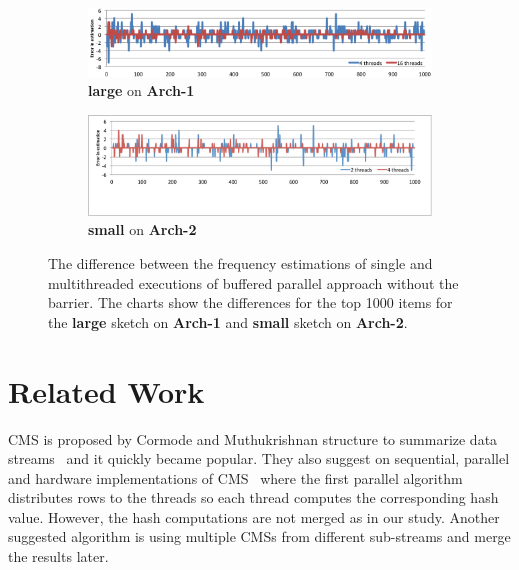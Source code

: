 \documentclass[10pt, review=true,sigconf]{acmart}
\begin{document}
\begin{figure}[htbp]
\begin{center}
\begin{subfigure}[t]{\textwidth}
\includegraphics[width=\linewidth]{error1.png}
\caption{{\bf large} on {\bf Arch-1}}
\label{fig:err1}
\end{subfigure}
\end{center}

\begin{center}
\begin{subfigure}[t]{\textwidth}
\includegraphics[width=\linewidth]{error2.pdf}
\caption{{\bf small} on {\bf Arch-2}}
\label{fig:err2}
\end{subfigure}
\end{center}

\caption{The difference between the frequency estimations of single and multithreaded executions of buffered parallel approach without the barrier. The charts show the differences for the top 1000 items for the {\bf large} sketch on {\bf Arch-1} and {\bf small} sketch on {\bf Arch-2}.}
\label{fig:err}
\end{figure}


\section{Related Work}\label{sec:related}

CMS is proposed by Cormode and Muthukrishnan structure to summarize data streams~\cite{cormode2005} and it quickly became popular. They also suggest on sequential, parallel and hardware implementations of CMS~\cite{cormode2012} where the first parallel algorithm distributes rows to the threads so each thread computes the corresponding hash value. However, the hash computations are not merged as in our study. Another suggested algorithm is using multiple CMSs from different sub-streams and merge the results later.
\end{document}
